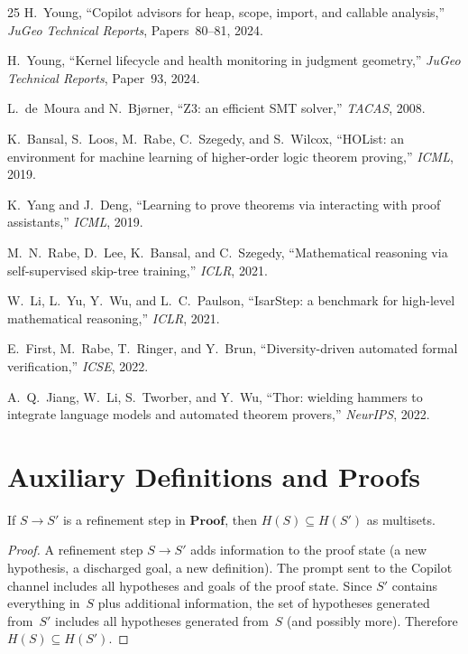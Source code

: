 \documentclass[11pt]{article}
\begin{document}
\begin{thebibliography}{25}
H.~Young,
``Copilot advisors for heap, scope, import, and callable
analysis,''
\emph{JuGeo Technical Reports}, Papers~80--81, 2024.

H.~Young,
``Kernel lifecycle and health monitoring in judgment geometry,''
\emph{JuGeo Technical Reports}, Paper~93, 2024.

L.~de~Moura and N.~Bj{\o}rner,
``Z3: an efficient SMT solver,''
\emph{TACAS}, 2008.

K.~Bansal, S.~Loos, M.~Rabe, C.~Szegedy, and S.~Wilcox,
``HOList: an environment for machine learning of higher-order
logic theorem proving,''
\emph{ICML}, 2019.

K.~Yang and J.~Deng,
``Learning to prove theorems via interacting with proof
assistants,''
\emph{ICML}, 2019.

M.~N.~Rabe, D.~Lee, K.~Bansal, and C.~Szegedy,
``Mathematical reasoning via self-supervised skip-tree
training,''
\emph{ICLR}, 2021.

W.~Li, L.~Yu, Y.~Wu, and L.~C.~Paulson,
``IsarStep: a benchmark for high-level mathematical
reasoning,''
\emph{ICLR}, 2021.

E.~First, M.~Rabe, T.~Ringer, and Y.~Brun,
``Diversity-driven automated formal verification,''
\emph{ICSE}, 2022.

A.~Q.~Jiang, W.~Li, S.~Tworber, and Y.~Wu,
``Thor: wielding hammers to integrate language models and
automated theorem provers,''
\emph{NeurIPS}, 2022.

\end{thebibliography}

\appendix

\section{Auxiliary Definitions and Proofs}\label{app:proofs}

\begin{lemma}%
\label{lem:hypref}
If $S \to S'$ is a refinement step in $\mathbf{Proof}$, then
$H(S) \subseteq H(S')$ as multisets.
\end{lemma}
\begin{proof}
A refinement step $S \to S'$ adds information to the proof
state (a new hypothesis, a discharged goal, a new definition).
The prompt sent to the Copilot channel includes all hypotheses
and goals of the proof state.  Since $S'$ contains everything
in~$S$ plus additional information, the set of hypotheses
generated from~$S'$ includes all hypotheses generated from~$S$
(and possibly more).  Therefore $H(S) \subseteq H(S')$.
\end{proof}
\end{document}
